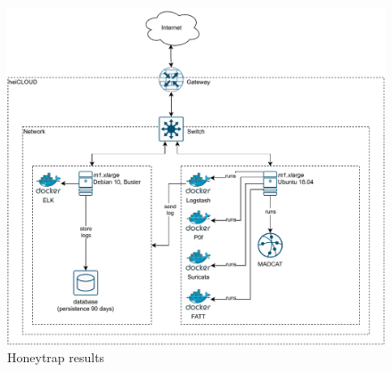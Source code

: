 \begin{figure}[h]
    \centering
    \includegraphics[width=\textwidth]{figures/heicat-conecpt.pdf}
    \caption[Honeytrap results]{Honeytrap results}
    \label{fig:madcat-architecture}
\end{figure}







